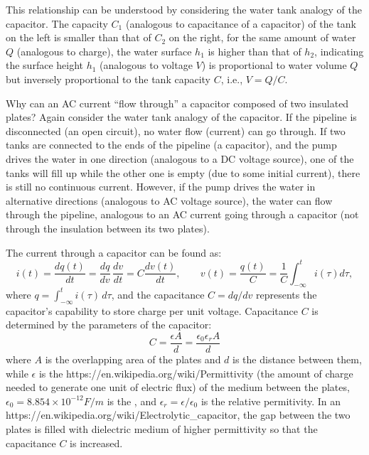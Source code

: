 \documentclass{article}
\begin{document}
\begin{itemize}
   
  
  This relationship can be understood by considering the water tank
  analogy of the capacitor. The capacity $C_1$ (analogous to capacitance
  of a capacitor) of the tank on the left is smaller than that of $C_2$
  on the right, for the same amount of water $Q$ (analogous to charge), 
  the water surface $h_1$ is higher than that of $h_2$, indicating the 
  surface height $h_1$ (analogous to voltage $V$) is proportional to 
  water volume $Q$ but inversely proportional to the tank capacity $C$,
  i.e., $V=Q/C$.
   
   
  Why can an AC current ``flow through'' a capacitor composed of two 
  insulated plates? Again consider the water tank analogy of the 
  capacitor. If the pipeline is disconnected (an open circuit), no 
  water flow (current) can go through. If two tanks are connected to 
  the ends of the pipeline (a capacitor), and the pump drives the 
  water in one direction (analogous to a DC voltage source), one of 
  the tanks will fill up while the other one is empty (due to some
  initial current), there is still no continuous current. However, 
  if the pump drives the water in alternative directions (analogous 
  to AC voltage source), the water can flow through the pipeline, 
  analogous to an AC current going through a capacitor (not through 
  the insulation between its two plates).

  The current through a capacitor can be found as:
  \begin{equation} 
    i(t)=\frac{dq(t)}{dt}=\frac{dq}{dv}\,\frac{dv}{dt}=C\frac{dv(t)}{dt},
    \;\;\;\;\;\;\;
    v(t)=\frac{q(t)}{C}=\frac{1}{C}\int_{-\infty}^t i(\tau) d\tau,
  \end{equation}
  where $q=\int_{-\infty}^t i(\tau)\,d\tau$, and the capacitance
  $C=dq/dv$ represents the capacitor's capability to store charge 
  per unit voltage.
  Capacitance $C$ is determined by the parameters of the capacitor:
  \begin{equation}
    C=\frac{\epsilon A}{d}=\frac{\epsilon_0\epsilon_r A}{d}
  \end{equation}
  where $A$ is the overlapping area of the plates and $d$ is the distance 
  between them, while $\epsilon$ is the 
  {https://en.wikipedia.org/wiki/Permittivity} (the amount of charge needed 
  to generate one unit of electric flux) of the medium between the plates,
  $\epsilon_0=8.854\times 10^{-12} F/m$ is the 
  , and $\epsilon_r=\epsilon/\epsilon_0$ is the relative permitivity.
  In an 
  {https://en.wikipedia.org/wiki/Electrolytic_capacitor}, the gap between
  the two plates is filled with dielectric medium of higher permittivity
  so that the capacitance $C$ is increased.  


\end{itemize}
\end{document}
